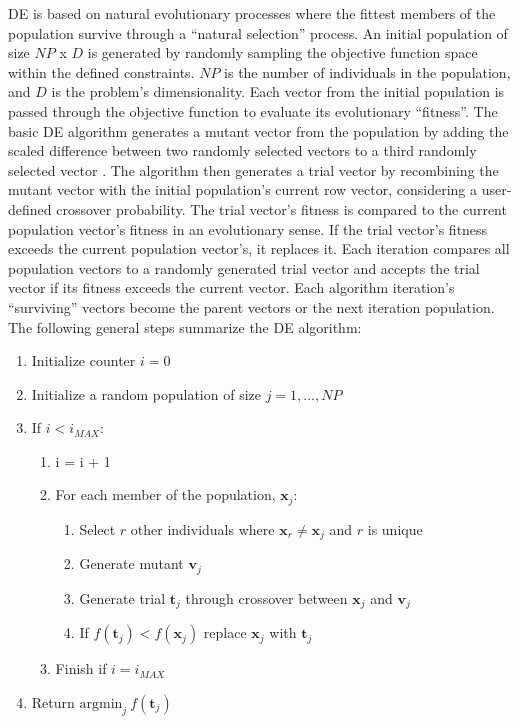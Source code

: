 \Gls{DE} is based on natural evolutionary processes where the fittest members of the population survive through a ``natural selection'' process. An initial population of size $NP$ x $D$ is generated by randomly sampling the objective function space within the defined constraints. $NP$ is the number of individuals in the population, and $D$ is the problem's dimensionality. Each vector from the initial population is passed through the objective function to evaluate its evolutionary ``fitness''. The basic \gls{DE} algorithm generates a mutant vector from the population by adding the scaled difference between two randomly selected vectors to a third randomly selected vector \citep{price2013differential}. The algorithm then generates a trial vector by recombining the mutant vector with the initial population's current row vector, considering a user-defined crossover probability. The trial vector's fitness is compared to the current population vector's fitness in an evolutionary sense. If the trial vector's fitness exceeds the current population vector's, it replaces it. Each iteration compares all population vectors to a randomly generated trial vector and accepts the trial vector if its fitness exceeds the current vector. Each algorithm iteration's ``surviving'' vectors become the parent vectors or the next iteration population. The following general steps summarize the \gls{DE} algorithm:
\begin{enumerate}[noitemsep]
    \item Initialize counter $i=0$
    \item Initialize a random population of size $j = 1, \dots, NP$
    \item If $i < i_{MAX}$:
          \begin{enumerate}
              \item i = i + 1
              \item For each member of the population, $\mathbf{x}_{j}$:
                    \begin{enumerate}[noitemsep]
                        \item Select $r$ other individuals where $\mathbf{x}_{r} \neq \mathbf{x}_{j}$ and $r$ is unique
                        \item Generate mutant $\mathbf{v}_{j}$
                        \item Generate trial $\mathbf{t}_{j}$ through crossover between $\mathbf{x}_{j}$ and $\mathbf{v}_{j}$
                        \item If $f(\mathbf{t}_{j}) < f(\mathbf{x}_{j})$ replace $\mathbf{x}_{j}$ with $\mathbf{t}_{j}$
                    \end{enumerate}
              \item Finish if $i = i_{MAX}$
          \end{enumerate}
    \item Return $\text{argmin}_{j} \ f(\mathbf{t}_{j})$
\end{enumerate}

